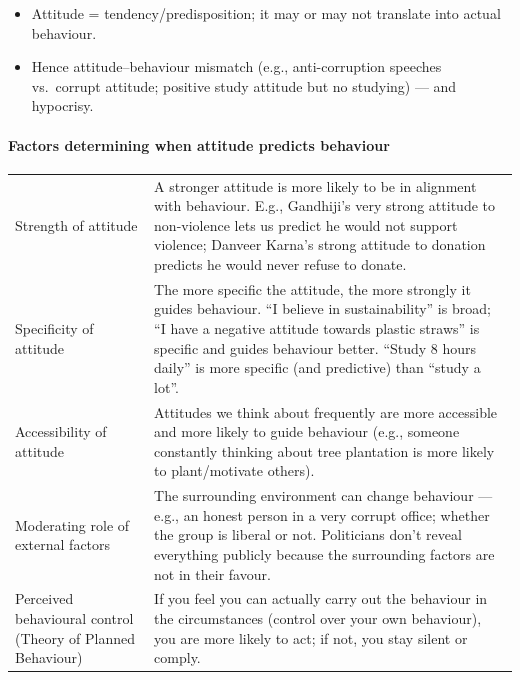 \begin{CriticalPoint}
\begin{itemize}
\item Attitude = tendency/predisposition; it may or may not translate into actual behaviour.
\item Hence attitude--behaviour mismatch (e.g., anti-corruption speeches vs.\ corrupt attitude; positive study attitude but no studying) --- and hypocrisy.
\end{itemize}
\end{CriticalPoint}

\paragraph{Factors determining when attitude predicts behaviour}

\begin{center}
\begin{tabularx}{\textwidth}{>{\raggedright\arraybackslash}p{3.4cm} Y}
 &  \\
\toprule
Strength of attitude & A stronger attitude is more likely to be in alignment with behaviour. E.g., Gandhiji's very strong attitude to non-violence lets us predict he would not support violence; Danveer Karna's strong attitude to donation predicts he would never refuse to donate. \\
Specificity of attitude & The more specific the attitude, the more strongly it guides behaviour. ``I believe in sustainability'' is broad; ``I have a negative attitude towards plastic straws'' is specific and guides behaviour better. ``Study 8 hours daily'' is more specific (and predictive) than ``study a lot''. \\
Accessibility of attitude & Attitudes we think about frequently are more accessible and more likely to guide behaviour (e.g., someone constantly thinking about tree plantation is more likely to plant/motivate others). \\
Moderating role of external factors & The surrounding environment can change behaviour --- e.g., an honest person in a very corrupt office; whether the group is liberal or not. Politicians don't reveal everything publicly because the surrounding factors are not in their favour. \\
Perceived behavioural control (Theory of Planned Behaviour) & If you feel you can actually carry out the behaviour in the circumstances (control over your own behaviour), you are more likely to act; if not, you stay silent or comply. \\
\bottomrule
\end{tabularx}
\end{center}

